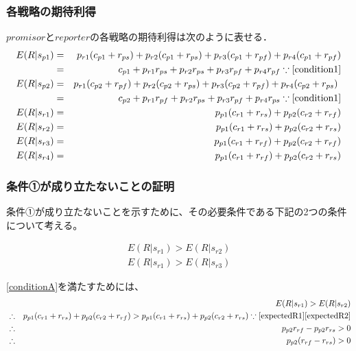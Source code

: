 \subsubsection{各戦略の期待利得}
$promisor$と$reporter$の各戦略の期待利得は次のように表せる．
\begin{eqnarray}
  E(R|s_{p1}) &=& p_{r1} (c_{p1} + r_{ps}) + p_{r2} (c_{p1} + r_{ps}) + p_{r3} (c_{p1} + r_{pf}) + p_{r4} (c_{p1} + r_{pf}) \nonumber \\
              &=& c_{p1} + p_{r1} r_{ps} + p_{r2} r_{ps} + p_{r3} r_{pf} + p_{r4} r_{pf} \because\eqref{condition1} \label{expectedA} \\
  E(R|s_{p2}) &=& p_{r1} (c_{p2} + r_{pf}) + p_{r2} (c_{p2} + r_{ps}) + p_{r3} (c_{p2} + r_{pf} ) + p_{r4} (c_{p2} + r_{ps}) \nonumber \\
              &=& c_{p2} + p_{r1} r_{pf} + p_{r2} r_{ps} + p_{r3} r_{pf} + p_{r4} r_{ps} \because\eqref{condition1} \label{expectedB} \\
  E(R|s_{r1}) &=& p_{p1} (c_{r1} + r_{rs}) + p_{p2} (c_{r2} + r_{rf}) \label{expectedR1} \\
  E(R|s_{r2}) &=& p_{p1} (c_{r1} + r_{rs}) + p_{p2} (c_{r2} + r_{rs}) \label{expectedR2} \\
  E(R|s_{r3}) &=& p_{p1} (c_{r1} + r_{rf}) + p_{p2} (c_{r2} + r_{rf}) \label{expectedR3} \\
  E(R|s_{r4}) &=& p_{p1} (c_{r1} + r_{rf}) + p_{p2} (c_{r2} + r_{rs}) \label{expectedR4} \nonumber
\end{eqnarray}

\subsubsection{条件①が成り立たないことの証明}

条件①が成り立たないことを示すために、その必要条件である下記の2つの条件について考える。

\begin{gather}
  E(R|s_{r1}) > E(R|s_{r2}) \label{conditionA} \\
  E(R|s_{r1}) > E(R|s_{r3}) \label{conditionB}
\end{gather}

\eqref{conditionA}を満たすためには、
\begin{eqnarray*}
  &&E(R|s_{r1}) > E(R|s_{r2}) \\
  &\therefore& p_{p1} (c_{r1} + r_{rs}) + p_{p2} (c_{r2} + r_{rf}) > p_{p1} (c_{r1} + r_{rs}) + p_{p2} (c_{r2} + r_{rs}) \because\eqref{expectedR1}\eqref{expectedR2}  \\
  &\therefore& p_{p2} r_{rf} - p_{p2} r_{rs} > 0 \\
  &\therefore& p_{p2} (r_{rf} - r_{rs}) > 0 \\
\end{eqnarray*}

